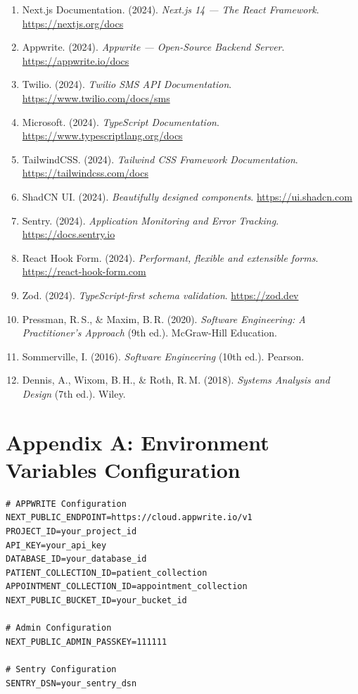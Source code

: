 \documentclass[11pt,a4paper]{article}
\begin{document}
\begin{enumerate}
    \item Next.js Documentation. (2024). \textit{Next.js 14 --- The React Framework}. \url{https://nextjs.org/docs}
    \item Appwrite. (2024). \textit{Appwrite --- Open-Source Backend Server}. \url{https://appwrite.io/docs}
    \item Twilio. (2024). \textit{Twilio SMS API Documentation}. \url{https://www.twilio.com/docs/sms}
    \item Microsoft. (2024). \textit{TypeScript Documentation}. \url{https://www.typescriptlang.org/docs}
    \item TailwindCSS. (2024). \textit{Tailwind CSS Framework Documentation}. \url{https://tailwindcss.com/docs}
    \item ShadCN UI. (2024). \textit{Beautifully designed components}. \url{https://ui.shadcn.com}
    \item Sentry. (2024). \textit{Application Monitoring and Error Tracking}. \url{https://docs.sentry.io}
    \item React Hook Form. (2024). \textit{Performant, flexible and extensible forms}. \url{https://react-hook-form.com}
    \item Zod. (2024). \textit{TypeScript-first schema validation}. \url{https://zod.dev}
    \item Pressman, R.\,S., \& Maxim, B.\,R. (2020). \textit{Software Engineering: A Practitioner's Approach} (9th ed.). McGraw-Hill Education.
    \item Sommerville, I. (2016). \textit{Software Engineering} (10th ed.). Pearson.
    \item Dennis, A., Wixom, B.\,H., \& Roth, R.\,M. (2018). \textit{Systems Analysis and Design} (7th ed.). Wiley.
\end{enumerate}

\newpage
\appendix
\section{Appendix A: Environment Variables Configuration}

\begin{verbatim}
# APPWRITE Configuration
NEXT_PUBLIC_ENDPOINT=https://cloud.appwrite.io/v1
PROJECT_ID=your_project_id
API_KEY=your_api_key
DATABASE_ID=your_database_id
PATIENT_COLLECTION_ID=patient_collection
APPOINTMENT_COLLECTION_ID=appointment_collection
NEXT_PUBLIC_BUCKET_ID=your_bucket_id

# Admin Configuration
NEXT_PUBLIC_ADMIN_PASSKEY=111111

# Sentry Configuration
SENTRY_DSN=your_sentry_dsn
\end{verbatim}
\end{document}
